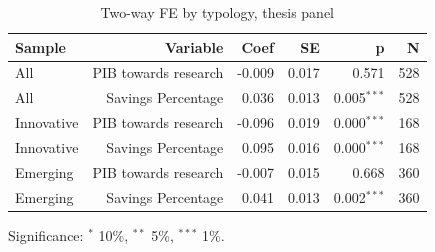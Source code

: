 \begin{table}[htbp]
\centering\small
\caption{Two-way FE by typology, thesis panel}
\label{tab:feA}
\begin{tabular}{lrrrrr}
\toprule
Sample & Variable & Coef & SE & p & N \\
\midrule
All & PIB towards research & -0.009 & 0.017 & 0.571 & 528 \\
All & Savings Percentage & 0.036 & 0.013 & 0.005$^{***}$ & 528 \\
Innovative & PIB towards research & -0.096 & 0.019 & 0.000$^{***}$ & 168 \\
Innovative & Savings Percentage & 0.095 & 0.016 & 0.000$^{***}$ & 168 \\
Emerging & PIB towards research & -0.007 & 0.015 & 0.668 & 360 \\
Emerging & Savings Percentage & 0.041 & 0.013 & 0.002$^{***}$ & 360 \\
\bottomrule
\end{tabular}
\par\footnotesize Significance: $^{*}$ 10\%, $^{**}$ 5\%, $^{***}$ 1\%.
\end{table}
